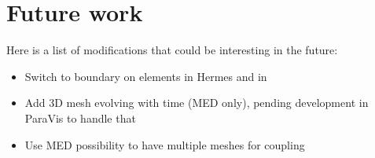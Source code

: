 %
\section{Future work}
%
Here is a list of modifications that could be interesting in the future:
\begin{itemize}
\item Switch to boundary on elements in Hermes and in \telemacsystem
\item Add 3D mesh evolving with time (MED only), pending development in
ParaVis to handle that
\item Use MED possibility to have multiple meshes for coupling
\end{itemize}
